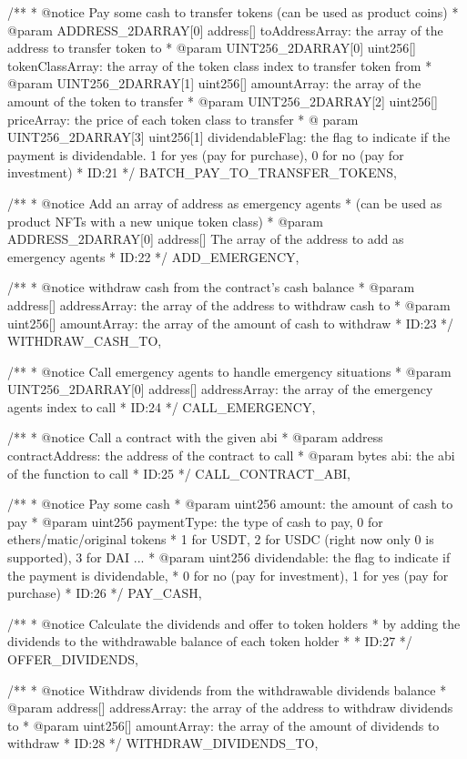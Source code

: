 \documentclass[main.tex]{subfiles}
\begin{document}
\begin{spverbatim}
  /**
   * @notice Pay some cash to transfer tokens (can be used as product coins)
   * @param ADDRESS_2DARRAY[0] address[] toAddressArray: the array of the address to transfer token to
   * @param UINT256_2DARRAY[0] uint256[] tokenClassArray: the array of the token class index to transfer token from
   * @param UINT256_2DARRAY[1] uint256[] amountArray: the array of the amount of the token to transfer
   * @param UINT256_2DARRAY[2] uint256[] priceArray: the price of each token class to transfer
   * @ param UINT256_2DARRAY[3] uint256[1] dividendableFlag: the flag to indicate if the payment is dividendable. 1 for yes (pay for purchase), 0 for no (pay for investment)
   * ID:21
   */
  BATCH_PAY_TO_TRANSFER_TOKENS,

  /**
   * @notice Add an array of address as emergency agents
   *  (can be used as product NFTs with a new unique token class)
   * @param ADDRESS_2DARRAY[0] address[] The array of the address to add as emergency agents 
   * ID:22
   */
  ADD_EMERGENCY,

  /**
   * @notice withdraw cash from the contract's cash balance
   * @param address[] addressArray: the array of the address to withdraw cash to
   * @param uint256[] amountArray: the array of the amount of cash to withdraw
   * ID:23
   */
  WITHDRAW_CASH_TO,

  /**
   * @notice Call emergency agents to handle emergency situations
   * @param UINT256_2DARRAY[0] address[] addressArray: the array of the emergency agents index to call
   * ID:24
   */
  CALL_EMERGENCY,


  /**
   * @notice Call a contract with the given abi
   * @param address contractAddress: the address of the contract to call
   * @param bytes abi: the abi of the function to call
   * ID:25
   */
  CALL_CONTRACT_ABI,

  /**
   * @notice Pay some cash
   * @param uint256 amount: the amount of cash to pay
   * @param uint256 paymentType: the type of cash to pay, 0 for ethers/matic/original tokens
   *  1 for USDT, 2 for USDC (right now only 0 is supported), 3 for DAI ...
   * @param uint256 dividendable: the flag to indicate if the payment is dividendable, 
   * 0 for no (pay for investment), 1 for yes (pay for purchase)
   * ID:26
   */
  PAY_CASH,

  /**
   * @notice Calculate the dividends and offer to token holders
   *  by adding the dividends to the withdrawable balance of each token holder
   * 
   * ID:27
   */
  OFFER_DIVIDENDS,

  /**
   * @notice Withdraw dividends from the withdrawable dividends balance
   * @param address[] addressArray: the array of the address to withdraw dividends to
   * @param uint256[] amountArray: the array of the amount of dividends to withdraw
   * ID:28
   */
  WITHDRAW_DIVIDENDS_TO,


\end{spverbatim}
\end{document}
